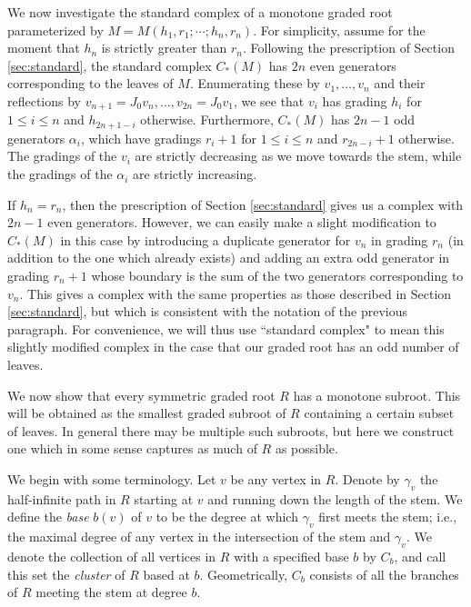 \documentclass[11 pt]{amsart}
\theoremstyle{remark}
\begin{document}
We now investigate the standard complex of a monotone graded root parameterized by $M = M(h_1, r_1; \cdots; h_n, r_n)$. For simplicity, assume for the moment that $h_n$ is strictly greater than $r_n$. Following the prescription of Section \ref{sec:standard}, the standard complex $C_*(M)$ has $2n$ even generators corresponding to the leaves of $M$. Enumerating these by $v_1, \ldots, v_n$ and their reflections by $v_{n+1}=J_0v_n, \dots, v_{2n}=J_0v_1$, we see that $v_i$ has grading $h_i$ for $1 \leq i \leq n$ and $h_{2n+1-i}$ otherwise. Furthermore, $C_*(M)$ has $2n-1$ odd generators $\alpha_i$, which have gradings $r_i + 1$ for $1 \leq i \leq n$ and $r_{2n - i} + 1$ otherwise. The gradings of the $v_i$ are strictly decreasing as we move towards the stem, while the gradings of the $\alpha_i$ are strictly increasing. 

If $h_n = r_n$, then the prescription of Section \ref{sec:standard} gives us a complex with $2n - 1$ even generators. However, we can easily make a slight modification to $C_*(M)$ in this case by introducing a duplicate generator for $v_n$ in grading $r_n$ (in addition to the one which already exists) and adding an extra odd generator in grading $r_n + 1$ whose boundary is the sum of the two generators corresponding to $v_n$. This gives a complex with the same properties as those described in Section \ref{sec:standard}, but which is consistent with the notation of the previous paragraph. For convenience, we will thus use ``standard complex" to mean this slightly modified complex in the case that our graded root has an odd number of leaves. 

We now show that every symmetric graded root $R$ has a monotone subroot. This will be obtained as the smallest graded subroot of $R$ containing a certain subset of leaves. In general there may be multiple such subroots, but here we construct one which in some sense captures as much of $R$ as possible. 

We begin with some terminology. Let $v$ be any vertex in $R$. Denote by $\gamma_v$ the half-infinite path in $R$ starting at $v$ and running down the length of the stem. We define the \textit{base} $b(v)$ of $v$ to be the degree at which $\gamma_v$ first meets the stem; i.e., the maximal degree of any vertex in the intersection of the stem and $\gamma_v$. We denote the collection of all vertices in $R$ with a specified base $b$ by $C_b$, and call this set the \textit{cluster} of $R$ based at $b$. Geometrically, $C_b$ consists of all the branches of $R$ meeting the stem at degree $b$. 
\end{document}
